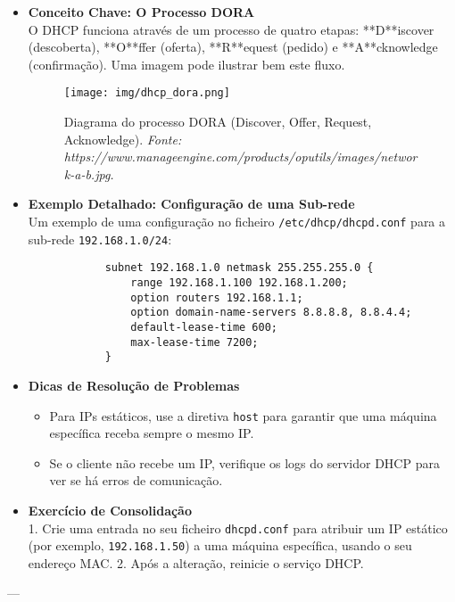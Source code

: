\documentclass[10pt,a4paper]{article}
\begin{document}
	\begin{itemize}
		\item \textbf{Conceito Chave: O Processo DORA} \\
		O DHCP funciona através de um processo de quatro etapas: **D**iscover (descoberta), **O**ffer (oferta), **R**equest (pedido) e **A**cknowledge (confirmação). Uma imagem pode ilustrar bem este fluxo.
		
		\begin{figure}[h]
			\centering
			\texttt{[image: img/dhcp\_dora.png]}
			\caption{Diagrama do processo DORA (Discover, Offer, Request, Acknowledge). \textit{Fonte: https://www.manageengine.com/products/oputils/images/network-a-b.jpg.}}
			\label{fig:dhcp_dora}
		\end{figure}
		
		\item \textbf{Exemplo Detalhado: Configuração de uma Sub-rede} \\
		Um exemplo de uma configuração no ficheiro \texttt{/etc/dhcp/dhcpd.conf} para a sub-rede \texttt{192.168.1.0/24}:
		\begin{verbatim}
			subnet 192.168.1.0 netmask 255.255.255.0 {
				range 192.168.1.100 192.168.1.200;
				option routers 192.168.1.1;
				option domain-name-servers 8.8.8.8, 8.8.4.4;
				default-lease-time 600;
				max-lease-time 7200;
			}
		\end{verbatim}
		
		\item \textbf{Dicas de Resolução de Problemas} \\
		\begin{itemize}
			\item Para IPs estáticos, use a diretiva \texttt{host} para garantir que uma máquina específica receba sempre o mesmo IP.
			\item Se o cliente não recebe um IP, verifique os logs do servidor DHCP para ver se há erros de comunicação.
		\end{itemize}
		
		\item \textbf{Exercício de Consolidação} \\
		1. Crie uma entrada no seu ficheiro \texttt{dhcpd.conf} para atribuir um IP estático (por exemplo, \texttt{192.168.1.50}) a uma máquina específica, usando o seu endereço MAC.
		2. Após a alteração, reinicie o serviço DHCP.
	\end{itemize}
	
	---
	
\end{document}
